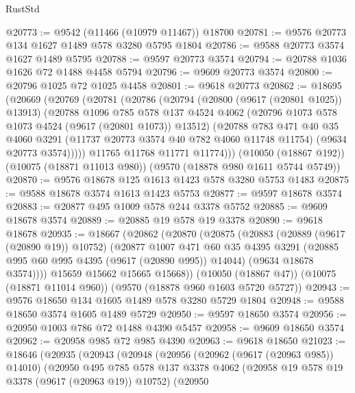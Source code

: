 \begin{lexlean}{RustStd}
\begin{coremodule}
@20773 := @9542 (@11466 (@10979 @11467)) @18700
@20781 := @9576 @20773 @134 @1627 @1489 @578 @3280 @5795 @1804
@20786 := @9588 @20773 @3574 @1627 @1489 @5795
@20788 := @9597 @20773 @3574
@20794 := @20788 @1036 @1626 @72 @1488 @4458 @5794
@20796 := @9609 @20773 @3574
@20800 := @20796 @1025 @72 @1025 @4458
@20801 := @9618 @20773
@20862 := @18695
    (@20669
      (@20769
        (@20781
          (@20786
            (@20794
              (@20800 (@9617 (@20801 @1025)) @13913)
              (@20788
                @1096
                @785
                @578
                @137
                @4524
                @4062
                (@20796 @1073 @578 @1073 @4524 (@9617 (@20801 @1073)) @13512)
                (@20788
                  @783
                  @471
                  @40
                  @35
                  @4060
                  @3291
                  (@11737 @20773 @3574 @40 @782 @4060 @11748 @11754)
                  (@9634 @20773 @3574)))))
          @11765
          @11768
          @11771
          @11774)))
    (@10050 (@18867 @192))
    (@10075 (@18871 @11013 @980))
    (@9570 (@18878 @980 @1611 @5744 @5749))
@20870 := @9576 @18678 @125 @1613 @1423 @578 @3280 @5753 @1483
@20875 := @9588 @18678 @3574 @1613 @1423 @5753
@20877 := @9597 @18678 @3574
@20883 := @20877 @495 @1009 @578 @244 @3378 @5752
@20885 := @9609 @18678 @3574
@20889 := @20885 @19 @578 @19 @3378
@20890 := @9618 @18678
@20935 := @18667
    (@20862
      (@20870
        (@20875
          (@20883
            (@20889 (@9617 (@20890 @19)) @10752)
            (@20877
              @1007
              @471
              @60
              @35
              @4395
              @3291
              (@20885 @995 @60 @995 @4395 (@9617 (@20890 @995)) @14044)
              (@9634 @18678 @3574))))
        @15659
        @15662
        @15665
        @15668))
    (@10050 (@18867 @47))
    (@10075 (@18871 @11014 @960))
    (@9570 (@18878 @960 @1603 @5720 @5727))
@20943 := @9576 @18650 @134 @1605 @1489 @578 @3280 @5729 @1804
@20948 := @9588 @18650 @3574 @1605 @1489 @5729
@20950 := @9597 @18650 @3574
@20956 := @20950 @1003 @786 @72 @1488 @4390 @5457
@20958 := @9609 @18650 @3574
@20962 := @20958 @985 @72 @985 @4390
@20963 := @9618 @18650
@21023 := @18646
    (@20935
      (@20943
        (@20948
          (@20956
            (@20962 (@9617 (@20963 @985)) @14010)
            (@20950
              @495
              @785
              @578
              @137
              @3378
              @4062
              (@20958 @19 @578 @19 @3378 (@9617 (@20963 @19)) @10752)
              (@20950

\end{coremodule}
\end{lexlean}
